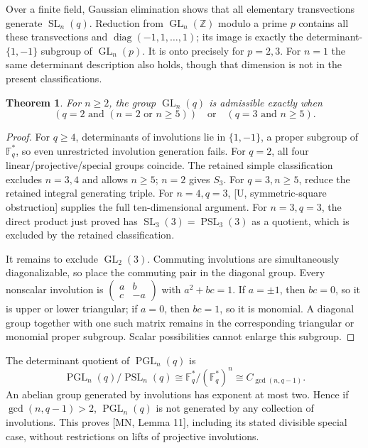 \documentclass[11pt]{article}
\newtheorem{theorem}{Theorem}\newtheorem{lemma}[theorem]{Lemma}
\newcommand{\GL}{\operatorname{GL}}\newcommand{\SL}{\operatorname{SL}}
\newcommand{\PGL}{\operatorname{PGL}}\newcommand{\PSL}{\operatorname{PSL}}
\newcommand{\diag}{\operatorname{diag}}\newcommand{\F}{\mathbb F}
\begin{document}
Over a finite field, Gaussian elimination shows that all elementary
transvections generate $\SL_n(q)$. Reduction from $\GL_n(\mathbb Z)$
modulo a prime $p$ contains all these transvections and
$\diag(-1,1,\ldots,1)$; its image is exactly the determinant-$\{1,-1\}$
subgroup of $\GL_n(p)$. It is onto precisely for $p=2,3$. For $n=1$
the same determinant description also holds, though that dimension is
not in the present classifications.

\begin{theorem}\label{gl}
For $n\geq2$, the group $\GL_n(q)$ is admissible exactly when
\[
 (q=2\text{ and }(n=2\text{ or }n\geq5))
 \quad\text{or}\quad(q=3\text{ and }n\geq5).
\]
\end{theorem}
\begin{proof}
For $q\geq4$, determinants of involutions lie in $\{1,-1\}$, a proper
subgroup of $\F_q^*$, so even unrestricted involution generation fails.
For $q=2$, all four linear/projective/special groups coincide. The retained
simple classification excludes $n=3,4$ and allows $n\geq5$; $n=2$ gives
$S_3$. For $q=3,n\geq5$, reduce the retained integral generating triple.
For $n=4,q=3$, [U, symmetric-square obstruction] supplies the full
ten-dimensional argument. For $n=3,q=3$, the direct product just proved
has $\SL_3(3)=\PSL_3(3)$ as a quotient, which is excluded by the retained
classification.

It remains to exclude $\GL_2(3)$. Commuting involutions are simultaneously
diagonalizable, so place the commuting pair in the diagonal group.
Every nonscalar involution is
$\left(\begin{smallmatrix}a&b\\c&-a\end{smallmatrix}\right)$ with
$a^2+bc=1$. If $a=\pm1$, then $bc=0$, so it is upper or lower triangular;
if $a=0$, then $bc=1$, so it is monomial. A diagonal group together with
one such matrix remains in the corresponding triangular or monomial
proper subgroup. Scalar possibilities cannot enlarge this subgroup.
\end{proof}

The determinant quotient of $\PGL_n(q)$ is
\[\PGL_n(q)/\PSL_n(q)\cong\F_q^*/(\F_q^*)^n\cong C_{\gcd(n,q-1)}.
\]
An abelian group generated by involutions has exponent at most two. Hence
if $\gcd(n,q-1)>2$, $\PGL_n(q)$ is not generated by any collection of
involutions. This proves [MN, Lemma 11], including its stated divisible
special case, without restrictions on lifts of projective involutions.
\end{document}
